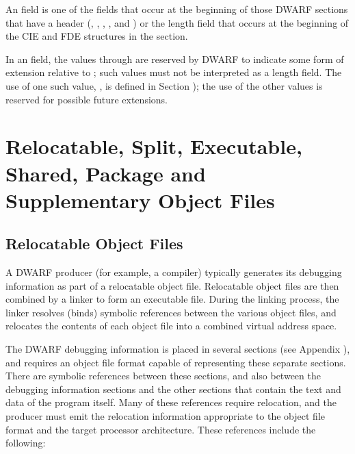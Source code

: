 An  field 
is one of the fields that occur at the beginning 
of those DWARF sections that have a header
(\dotdebugaranges{}, 
\dotdebuginfo{}, 
\dotdebugline{},
\dotdebugloclists{},
\dotdebugnames{} and
\dotdebugrnglists) 
or the length field
that occurs at the beginning of the CIE and FDE structures
in the \dotdebugframe{} section.

In an  field, the values \wfffffffzero through
\wffffffff are reserved by DWARF to indicate some form of
extension relative to \DWARFVersionII; such values must not
be interpreted as a length field. The use of one such value,
\xffffffff, is defined in
Section ); 
the use of
the other values is reserved for possible future extensions.


\section{Relocatable, Split, Executable, Shared, Package and Supplementary Object Files} 
\label{datarep:executableobjectsandsharedobjects}

\subsection{Relocatable Object Files}
\label{datarep:relocatableobjectfiles}
A DWARF producer (for example, a compiler) typically generates its
debugging information as part of a relocatable object file.
Relocatable object files are then combined by a linker to form an
executable file. During the linking process, the linker resolves
(binds) symbolic references between the various object files, and
relocates the contents of each object file into a combined virtual
address space.

The DWARF debugging information is placed in several sections (see
Appendix ), and 
requires an object file format capable of
representing these separate sections. There are symbolic references
between these sections, and also between the debugging information
sections and the other sections that contain the text and data of the
program itself. Many of these references require relocation, and the
producer must emit the relocation information appropriate to the
object file format and the target processor architecture. These
references include the following:

